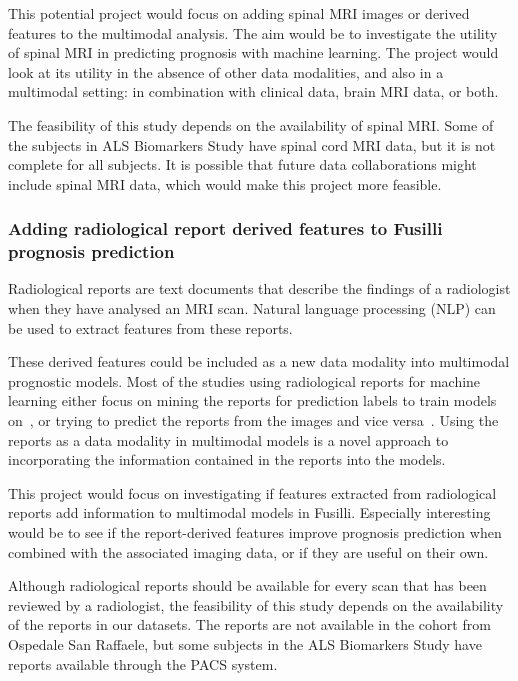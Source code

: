 This potential project would focus on adding spinal MRI images or derived features to the multimodal analysis.
The aim would be to investigate the utility of spinal MRI in predicting prognosis with machine learning.
The project would look at its utility in the absence of other data modalities, and also in a multimodal setting: in combination with clinical data, brain MRI data, or both.

The feasibility of this study depends on the availability of spinal MRI.
Some of the subjects in ALS Biomarkers Study have spinal cord MRI data, but it is not complete for all subjects.
It is possible that future data collaborations might include spinal MRI data, which would make this project more feasible.

\subsubsection{Adding radiological report derived features to Fusilli prognosis prediction}

Radiological reports are text documents that describe the findings of a radiologist when they have analysed an MRI scan.
Natural language processing (NLP) can be used to extract features from these reports.

These derived features could be included as a new data modality into multimodal prognostic models.
Most of the studies using radiological reports for machine learning either focus on mining the reports for prediction labels to train models on~\cite{nowakDevelopmentImagebasedDecision2023}, or trying to predict the reports from the images and vice versa~\cite{panChestRadiologyReport2024, gajbhiyeTranslatingMedicalImage2022}.
Using the reports as a data modality in multimodal models is a novel approach to incorporating the information contained in the reports into the models.

This project would focus on investigating if features extracted from radiological reports add information to multimodal models in Fusilli.
Especially interesting would be to see if the report-derived features improve prognosis prediction when combined with the associated imaging data, or if they are useful on their own.

Although radiological reports should be available for every scan that has been reviewed by a radiologist, the feasibility of this study depends on the availability of the reports in our datasets.
The reports are not available in the cohort from Ospedale San Raffaele, but some subjects in the ALS Biomarkers Study have reports available through the PACS system.

